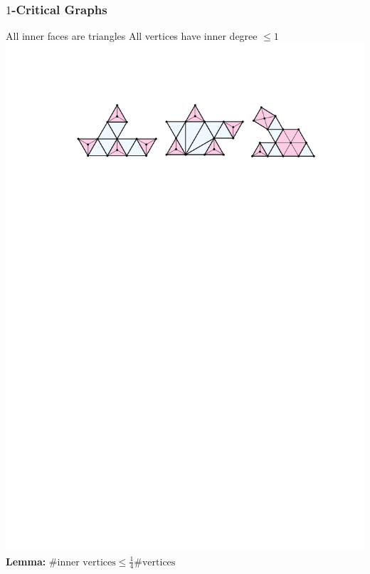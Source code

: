 \documentclass{beamer}
\begin{document}
\begin{frame}
  \frametitle{$1$-Critical Graphs}

  All inner faces are triangles \newline
  All vertices have inner degree $\le 1$ \\[3em]

  \includegraphics[width=.98\textwidth]{figs/critical}\\[3em]

  \textbf{Lemma:} $\text{\#inner vertices} \le \tfrac{1}{4}\text{\#vertices}$
\end{frame}
\end{document}
